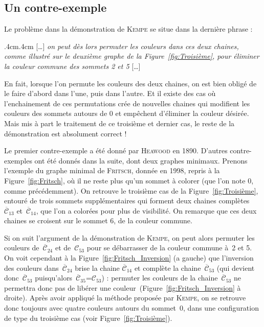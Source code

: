 \subsection{Un contre-exemple}

Le problème dans la démonstration de \textsc{Kempe} se situe dans la dernière phrase :
\begin{changemargin}{.4cm}{.4cm}
	[…] \textit{on peut dès lors permuter les couleurs dans ces deux chaines, comme illustré sur le deuxième graphe de la Figure~\ref{fig:Troisième}, pour éliminer la couleur commune des sommets 2 et 5} […]
\end{changemargin}
En fait, lorsque l'on permute les couleurs des deux chaines, on est bien obligé de le faire d'abord dans l'une, puis dans l'autre. Et il existe des cas où l'enchainement de ces permutations crée de nouvelles chaines qui modifient les couleurs des sommets autours de 0 et empêchent d'éliminer la couleur désirée. Mais mis à part le traitement de ce troisième et dernier cas, le reste de la démonstration est absolument correct !

Le premier contre-exemple a été donné par \textsc{Heawood} en 1890. D'autres contre-exemples ont été donnés dans la suite, dont deux graphes minimaux.  Prenons l'exemple du graphe minimal de \textsc{Fritsch}, donnée en 1998, repris à la Figure~\ref{fig:Fritsch}, où il ne reste plus qu'un sommet à colorer (que l'on note 0, comme précédemment).  On retrouve le troisième cas de la Figure~\ref{fig:Troisième}, entouré de trois sommets supplémentaires qui forment deux chaines complètes~$\overline{\mathcal{C}}_{13}$ et~$\overline{\mathcal{C}}_{14}$, que l'on a colorées pour plus de visibilité. On remarque que ces deux chaines se croisent sur le sommet 6, de la couleur commune.

\begin{SCfigure}[][t!]
	
	\caption{Graphe de Fritsch\\\footnotesize\textit{Contre-exemple minimal} [1998]}\label{fig:Fritsch}
\end{SCfigure}
\FloatBarrier

Si on suit l'argument de la démonstration de \textsc{Kempe}, on peut alors permuter les couleurs de~$\overline{\mathcal{C}}_{24}$ et de~$\mathcal{C}_{53}$ pour se débarrasser de la couleur commune à~2 et 5. On voit cependant à la Figure~\ref{fig:Fritsch_Inversion} (a gauche) que l'inversion des couleurs dans~$\overline{\mathcal{C}}_{24}$ brise la chaine 
$\overline{\mathcal{C}}_{14}$ et complète la chaine~$\overline{\mathcal{C}}_{53}$ (qui devient donc~$\overline{\mathcal{C}}_{53}$ puisqu'alors~$\overline{\mathcal{C}}_{35}$=$\mathcal{C}_{53}$) : permuter les couleurs de la chaine~$\overline{\mathcal{C}}_{53}$ ne permettra donc pas de libérer une couleur~(Figure~\ref{fig:Fritsch_Inversion} à droite). Après avoir appliqué la méthode proposée par \textsc{Kempe}, on se retrouve donc toujours avec quatre couleurs autours du sommet~0, dans une configuration de type du troisième cas (voir Figure~\ref{fig:Troisième}).

